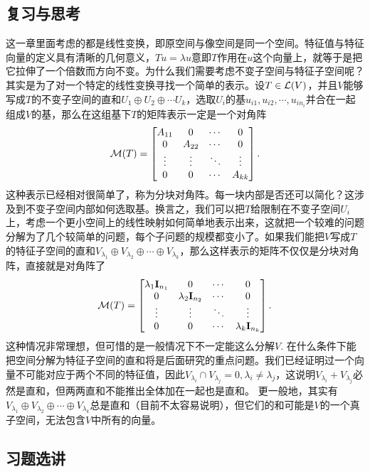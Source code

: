 \documentclass[hyperref,]{ctexart}
\begin{document}
\subsection{复习与思考}\label{ux590dux4e60ux4e0eux601dux8003-1}

这一章里面考虑的都是线性变换，即原空间与像空间是同一个空间。特征值与特征向量的定义具有清晰的几何意义，\(Tu=\lambda u\)意即\(T\)作用在\(u\)这个向量上，就等于是把它拉伸了一个倍数而方向不变。为什么我们需要考虑不变子空间与特征子空间呢？其实是为了对一个特定的线性变换寻找一个简单的表示。设\(T\in\mathcal{L}(V)\)，并且\(V\)能够写成\(T\)的不变子空间的直和\(U_1\oplus U_2\oplus\cdots U_k\)，选取\(U_i\)的基\(u_{i1},u_{i2},\cdots,u_{in_i}\)并合在一起组成\(V\)的基，那么在这组基下\(T\)的矩阵表示一定是一个对角阵
\[\mathcal{M}(T)=
\begin{bmatrix}
A_{11} &0&\cdots&0\\
0&A_{22}&\cdots&0\\
\vdots&\vdots&\ddots&\vdots\\
0&0&\cdots&A_{kk}
\end{bmatrix}.
\]
这种表示已经相对很简单了，称为分块对角阵。每一块内部是否还可以简化？这涉及到不变子空间内部如何选取基。换言之，我们可以把\(T\)给限制在不变子空间\(U_i\)上，考虑一个更小空间上的线性映射如何简单地表示出来，这就把一个较难的问题分解为了几个较简单的问题，每个子问题的规模都变小了。如果我们能把\(V\)写成\(T\)的特征子空间的直和\(V_{\lambda_1}\oplus V_{\lambda_2}\oplus\cdots\oplus V_{\lambda_k}\)，那么这样表示的矩阵不仅仅是分块对角阵，直接就是对角阵了
\[\mathcal{M}(T)=
\begin{bmatrix}
\lambda_1\mathbf{I}_{n_1} &0&\cdots&0\\
0&\lambda_2\mathbf{I}_{n_2}&\cdots&0\\
\vdots&\vdots&\ddots&\vdots\\
0&0&\cdots&\lambda_k\mathbf{I}_{n_k}
\end{bmatrix}.
\] 这种情况非常理想，但可惜的是一般情况下不一定能这么分解\(V\).
在什么条件下能把空间分解为特征子空间的直和将是后面研究的重点问题。我们已经证明过一个向量不可能对应于两个不同的特征值，因此\(V_{\lambda_i}\cap V_{\lambda_j}={0},\lambda_i\ne \lambda_j\)，这说明\(V_{\lambda_i}+V_{\lambda_j}\)必然是直和，但两两直和不能推出全体加在一起也是直和。
更一般地，其实有\(V_{\lambda_1}\oplus V_{\lambda_2}\oplus\cdots\oplus V_{\lambda_k}\)总是直和（目前不太容易说明），但它们的和可能是\(V\)的一个真子空间，无法包含\(V\)中所有的向量。

\subsection{习题选讲}\label{ux4e60ux9898ux9009ux8bb2-2}
\end{document}
